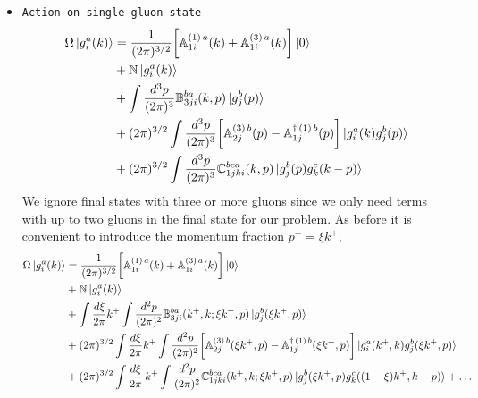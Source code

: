\documentclass[aps,prd,amsmath,amssymb,nofootinbib]{revtex4-2}
\def\mf#1{\mathbb{#1}}
\numberwithin{equation}{section}
\begin{document}
\begin{itemize}
\begin{align}
\end{align}
These relations will help us fix coefficients $ \mf{N}$, $\mf{A}^{(1)}$, $\mf{A}^{(3)}$ and $\mf{B}_{2}$. 
The remaining two coefficients can be fixed by considering $\Omega$ acting on a single gluon state. 
\item{\texttt{Action on single gluon state}} 
\begin{align}\label{Omegaongmom}
    \Omega\ket{g^{a}_{i}(k)} & =  \frac{1}{(2\pi)^{3/2}} \bigg[\mf{A}^{(1)\, a}_{1i}(k)+\mf{A}^{(3)\, a}_{1i}(k)\bigg]\ket{0} \notag \\ &
   + \mf{N}\ket{g^{a}_{i}(k)} \notag \\ & 
    +\int  \frac{d^3p}{(2\pi)^3} \mf{B} ^{ba}_{3ji}(k,p)\ket{g^{b}_{j}(p)} \notag \\ & 
    + (2\pi)^{3/2}\int \frac{d^3p}{(2\pi)^3}  \bigg[\mf{A}^{(3)\, b}_{2j}(p) - \mf{A}^{\dagger\, (1)\, b}_{1j}(p)\bigg]  \ket{g^{a}_{i}(k)g^{b}_{j}(p)} \notag \\ & 
    + (2\pi)^{3/2}\int \frac{d^3p}{(2\pi)^3} \mf{C}^{bca}_{1jki}(k,p)\ket{g^{b}_{j}(p)g^{c}_{k}(k-p)}
\end{align}
We ignore final states with three or more gluons since we only need terms with up to two gluons in the final state for our problem. As before it is convenient to introduce the momentum fraction  $p^{+} = \xi k^{+}$,
\begin{align}\label{Omegaongmomzeta}
    \Omega\ket{g^{a}_{i}(k)} & = \frac{1}{(2\pi)^{3/2}} \bigg[\mf{A}^{(1)\, a}_{1i}( k)+\mf{A}^{(3)\, a}_{1i}(k)\bigg]\ket{0} \notag \\ & 
   +  \mf{N}\ket{g^{a}_{i}(k)} \notag \\ & 
    + \int \frac{d\xi}{2\pi}k^{+}\int  \frac{d^{2}p}{(2\pi)^2} \mf{B} ^{ba}_{3ji}(k^{+},k; \xi k^{+},p)\ket{g^{b}_{j}(\xi k^{+},p)} \notag \\ & 
    + (2\pi)^{3/2}\int \frac{d\xi}{2\pi} k^{+}\int \frac{d^2p}{(2\pi)^2}  \bigg[\mf{A}^{(3)\, b}_{2j}(\xi k^{+}, p) - \mf{A}^{\dagger\, (1)\, b}_{1j}(\xi k^{+},p)\bigg]  \ket{g^{a}_{i}(k^{+},k)g^{b}_{j}(\xi k^{+},p)} \notag \\ & 
    + (2\pi)^{3/2}\int \frac{d\xi}{2\pi}\, k^{+} \int \frac{d^{2}p}{(2\pi)^{2}}\mf{C}^{bca}_{1jki}(k^{+}, k; \xi k^{+}, p)\ket{g^{b}_{j}(\xi k^{+}, p)g^{c}_{k}((1-\xi)k^{+}, k-p)} %
    + \ldots 
\end{align}

\end{itemize}
\end{document}

